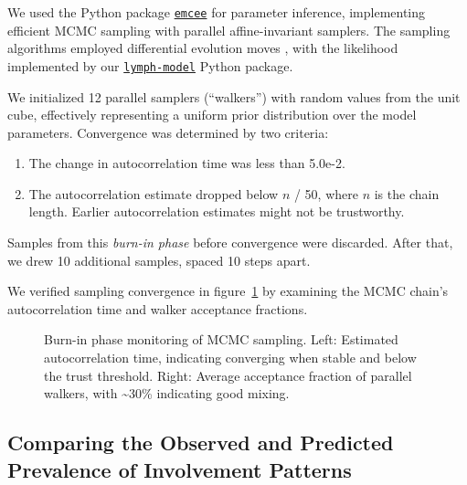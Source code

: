 \documentclass[
  sn-mathphys-num,
]{sn-jnl}
\makeatletter
\providecommand{\tightlist}{%
  \setlength{\itemsep}{0pt}\setlength{\parskip}{0pt}}\usepackage{longtable,booktabs,array}
\newcommand*\pandocbounded[1]{%
  \sbox\pandoc@box{#1}%
  \Gscale@div\@tempa{\textheight}{\dimexpr\ht\pandoc@box+\dp\pandoc@box\relax}%
  \Gscale@div\@tempb{\linewidth}{\wd\pandoc@box}%
  \ifdim\@tempb\p@<\@tempa\p@\let\@tempa\@tempb\fi%
  \ifdim\@tempa\p@<\p@\scalebox{\@tempa}{\usebox\pandoc@box}%
  \else\usebox{\pandoc@box}%
  \fi%
}
\makeatother
\begin{document}
We used the Python package
\href{https://emcee.readthedocs.io/en/stable/}{\texttt{emcee}}
\citep{foreman-mackey_emcee_2013} for parameter inference, implementing
efficient MCMC sampling with parallel affine-invariant samplers. The
sampling algorithms employed differential evolution moves
\citep{terbraak_differential_2008, nelson_run_2013}, with the likelihood
implemented by our
\href{https://lymph-model.readthedocs.io/en/stable/}{\texttt{lymph-model}}
Python package.

We initialized 12 parallel samplers (``walkers'') with random values
from the unit cube, effectively representing a uniform prior
distribution over the model parameters. Convergence was determined by
two criteria:

\begin{enumerate}
\def\labelenumi{\arabic{enumi}.}
\tightlist
\item
  The change in autocorrelation time was less than 5.0e-2.
\item
  The autocorrelation estimate dropped below \(n\) / 50, where \(n\) is
  the chain length. Earlier autocorrelation estimates might not be
  trustworthy.
\end{enumerate}

Samples from this \emph{burn-in phase} before convergence were
discarded. After that, we drew 10 additional samples, spaced 10 steps
apart.

We verified sampling convergence in
figure~\ref{fig-model-burnin-history} by examining the MCMC chain's
autocorrelation time and walker acceptance fractions.

\begin{figure}

\centering{

\pandocbounded{}

}

\caption{\label{fig-model-burnin-history}Burn-in phase monitoring of
MCMC sampling. Left: Estimated autocorrelation time, indicating
converging when stable and below the trust threshold. Right: Average
acceptance fraction of parallel walkers, with \textasciitilde30\%
indicating good mixing.}

\end{figure}%

\subsection{Comparing the Observed and Predicted Prevalence of
Involvement Patterns}\label{sec-prevalence}
\end{document}
